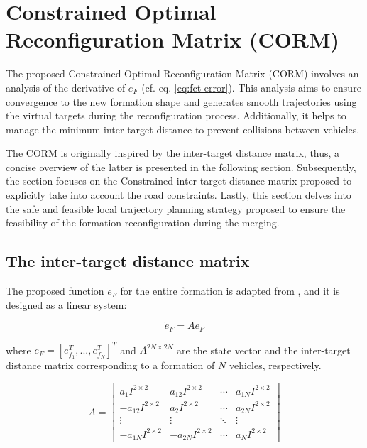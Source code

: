    
 \section{Constrained Optimal Reconfiguration Matrix (CORM)} \label{sec:CORM}  



The proposed Constrained Optimal Reconfiguration Matrix (CORM) involves an analysis of the derivative of $e_F$ (cf. eq. \ref{eq:fct error}). This analysis aims to ensure convergence to the new formation shape and generates smooth trajectories using the virtual targets during the reconfiguration process. Additionally, it helps to manage the minimum inter-target distance to prevent collisions between vehicles. 

The CORM is originally inspired by the inter-target distance matrix, thus, a concise overview of the latter is presented in the following section. Subsequently, the section focuses on the Constrained inter-target distance matrix proposed to explicitly take into account the road constraints. Lastly, this section delves into the safe and feasible local trajectory planning strategy proposed to ensure the feasibility of the formation reconfiguration during the merging. 



\subsection{The inter-target distance matrix} \label{sec:Inter-target-distance-matrix}

The proposed function $\dot{e}_F$ for the entire formation is adapted from \cite{ventura2015safe}\cite{8430659}, and it is designed as a linear system: 

\begin{equation}\label{eq:linearSystem}
    \dot{e}_{F}= Ae_F
\end{equation}

where $e_F=[e_{f_{1}}^T, ..., e_{f_{N}}^T]^T$ and $A^{2N \times 2N}$ are the state vector and the inter-target distance matrix corresponding to a formation of $N$ vehicles, respectively. 

\begin{equation}\label{eq: reconfiguration matrix}
A = 
 \begin{bmatrix}
  a_{1}I^{2 \times 2} & a_{12}I^{2 \times 2} & \cdots & a_{1N}I^{2 \times 2} \\
  -a_{12}I^{2 \times 2} & a_{2}I^{2 \times 2} & \cdots & a_{2N}I^{2 \times 2} \\
  \vdots  & \vdots  & \ddots & \vdots  \\
  -a_{1N}I^{2 \times 2} & -a_{2N}I^{2 \times 2} & \cdots & a_{N}I^{2 \times 2} 
 \end{bmatrix}
\end{equation}

